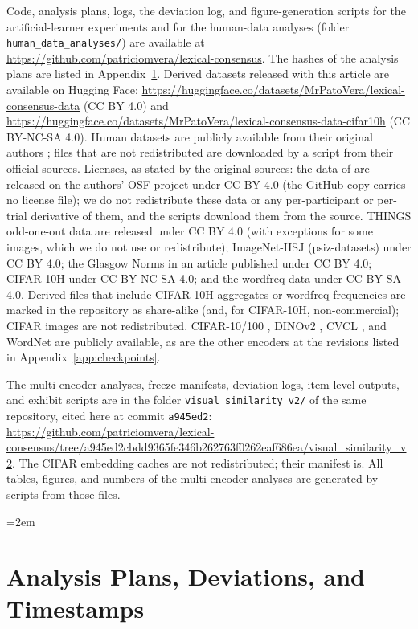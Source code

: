 \documentclass[11pt]{article}
\begin{document}
Code, analysis plans, logs, the deviation log, and figure-generation scripts for the artificial-learner experiments and for the human-data analyses (folder \texttt{human\_data\_analyses/}) are available at \url{https://github.com/patriciomvera/lexical-consensus}. The hashes of the analysis plans are listed in Appendix~\ref{app:deviations}. Derived datasets released with this article are available on Hugging Face: \url{https://huggingface.co/datasets/MrPatoVera/lexical-consensus-data} (CC BY 4.0) and \url{https://huggingface.co/datasets/MrPatoVera/lexical-consensus-data-cifar10h} (CC BY-NC-SA 4.0). Human datasets are publicly available from their original authors \parencite{lewis2018,hebart2023,roads2021,peterson2019,scott2019}; files that are not redistributed are downloaded by a script from their official sources. Licenses, as stated by the original sources: the data of \textcite{lewis2018} are released on the authors' OSF project under CC BY 4.0 (the GitHub copy carries no license file); we do not redistribute these data or any per-participant or per-trial derivative of them, and the scripts download them from the source. THINGS odd-one-out data are released under CC BY 4.0 (with exceptions for some images, which we do not use or redistribute); ImageNet-HSJ (psiz-datasets) under CC BY 4.0; the Glasgow Norms in an article published under CC BY 4.0; CIFAR-10H under CC BY-NC-SA 4.0; and the wordfreq data under CC BY-SA 4.0. Derived files that include CIFAR-10H aggregates or wordfreq frequencies are marked in the repository as share-alike (and, for CIFAR-10H, non-commercial); CIFAR images are not redistributed. CIFAR-10/100 \parencite{krizhevsky2009}, DINOv2 \parencite{oquab2023}, CVCL \parencite{vong2024}, and WordNet \parencite{miller1995} are publicly available, as are the other encoders at the revisions listed in Appendix~\ref{app:checkpoints}.

The multi-encoder analyses, freeze manifests, deviation logs, item-level outputs, and exhibit scripts are in the folder \texttt{visual\_similarity\_v2/} of the same repository, cited here at commit \texttt{a945ed2}: \url{https://github.com/patriciomvera/lexical-consensus/tree/a945ed2cbdd9365fe346b262763f0262eaf686ea/visual_similarity_v2}. The CIFAR embedding caches are not redistributed; their manifest is. All tables, figures, and numbers of the multi-encoder analyses are generated by scripts from those files.


{\emergencystretch=2em\printbibliography}

\appendix
\section{Analysis Plans, Deviations, and Timestamps}
\label{app:deviations}
\end{document}
